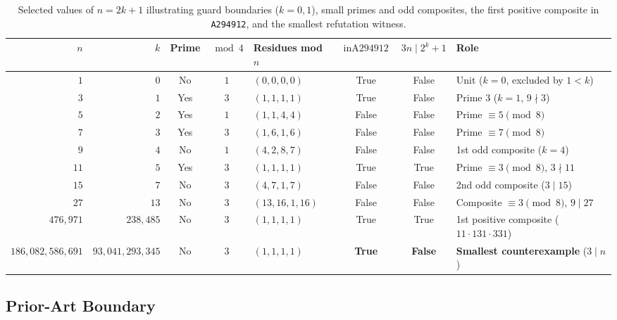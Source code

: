 \documentclass[11pt]{article}
\theoremstyle{definition}
\newcommand{\seq}[1]{\texttt{#1}}
\newcommand{\inA}{\operatorname{inA294912}}
\begin{document}
\begin{table}[ht]
\centering
\caption{Selected values of $n = 2k + 1$ illustrating guard boundaries ($k = 0, 1$), small primes and odd composites, the first positive composite in \seq{A294912}, and the smallest refutation witness.}
\label{tab:edge-cases}
\smallskip
{\footnotesize
\setlength{\tabcolsep}{3.5pt}
\begin{tabular}{@{}r r c c l c c >{\raggedright\arraybackslash}p{3.4cm}@{}}
\toprule
$n$ & $k$ & Prime & $\bmod 4$ & Residues mod $n$ & $\inA$ & $3n \mid 2^k{+}1$ & Role \\
\midrule
$1$ & $0$ & No & $1$ & $(0, 0, 0, 0)$ & True & False & Unit ($k = 0$, excluded by $1 < k$) \\
$3$ & $1$ & Yes & $3$ & $(1, 1, 1, 1)$ & True & False & Prime $3$ ($k = 1$, $9 \nmid 3$) \\
$5$ & $2$ & Yes & $1$ & $(1, 1, 4, 4)$ & False & False & Prime $\equiv 5 \pmod 8$ \\
$7$ & $3$ & Yes & $3$ & $(1, 6, 1, 6)$ & False & False & Prime $\equiv 7 \pmod 8$ \\
$9$ & $4$ & No & $1$ & $(4, 2, 8, 7)$ & False & False & 1st odd composite ($k = 4$) \\
$11$ & $5$ & Yes & $3$ & $(1, 1, 1, 1)$ & True & True & Prime $\equiv 3 \pmod 8$, $3 \nmid 11$ \\
$15$ & $7$ & No & $3$ & $(4, 7, 1, 7)$ & False & False & 2nd odd composite ($3 \mid 15$) \\
$27$ & $13$ & No & $3$ & $(13, 16, 1, 16)$ & False & False & Composite $\equiv 3 \pmod 8$, $9 \mid 27$ \\
$476{,}971$ & $238{,}485$ & No & $3$ & $(1, 1, 1, 1)$ & True & True & 1st positive composite ($11{\cdot}131{\cdot}331$) \\
$186{,}082{,}586{,}691$ & $93{,}041{,}293{,}345$ & No & $3$ & $(1, 1, 1, 1)$ & \textbf{True} & \textbf{False} & \textbf{Smallest counterexample} ($3 \mid n$) \\
\bottomrule
\end{tabular}
}
\end{table}

\subsection{Prior-Art Boundary}
\end{document}
